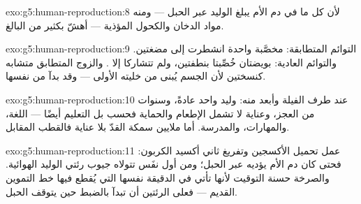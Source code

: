 \begin{solution}{exo:g5:human-reproduction:8}
لأن كل ما في دم الأم يبلغ الوليد عبر الحبل --- ومنه مواد الدخان
والكحول المؤذية ---  أهشّ بكثير من البالغ.
\end{solution}

\begin{solution}{exo:g5:human-reproduction:9}
التوائم المتطابقة:  مخصَّبة واحدة انشطرت إلى مضغتين. والتوائم
العادية: بويضتان خُصِّبتا بنطفتين، ولم تتشاركا إلا . والزوج
المتطابق متشابه كنسختين لأن الجسم يُبنى من خليته الأولى --- وقد
بدآ من  نفسها.
\end{solution}

\begin{solution}{exo:g5:human-reproduction:10}
عند طرف الفيلة وأبعد منه: وليد واحد عادةً، وسنوات من العجز، وعناية
لا تشمل الإطعام والحماية فحسب بل التعليم أيضًا --- اللغة،
والمهارات، والمدرسة. أما ملايين سمكة القدّ بلا عناية فالقطب
المقابل.
\end{solution}

\begin{solution}{exo:g5:human-reproduction:11}
عمل تحميل الأكسجين وتفريغ ثاني أكسيد الكربون: فحتى  كان دم
الأم يؤديه عبر الحبل؛ ومن أول نفَس تتولاه جيوب رئتي الوليد
الهوائية. والصرخة حسنة التوقيت لأنها تأتي في الدقيقة نفسها التي
يُقطع فيها خط التموين القديم --- فعلى الرئتين أن تبدآ بالضبط حين
يتوقف الحبل.
\end{solution}
